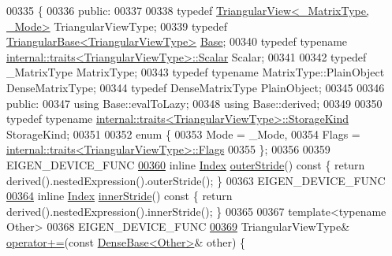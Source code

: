 \begin{DoxyCode}
00335 \{
00336   \textcolor{keyword}{public}:
00337 
00338     \textcolor{keyword}{typedef} \hyperlink{group___core___module_class_eigen_1_1_triangular_view}{TriangularView<\_MatrixType, \_Mode>} TriangularViewType;
00339     \textcolor{keyword}{typedef} \hyperlink{group___core___module_class_eigen_1_1_triangular_base}{TriangularBase<TriangularViewType>} 
      \hyperlink{class_eigen_1_1_triangular_view_impl}{Base};
00340     \textcolor{keyword}{typedef} \textcolor{keyword}{typename} \hyperlink{struct_eigen_1_1internal_1_1traits}{internal::traits<TriangularViewType>::Scalar}
       Scalar;
00341 
00342     \textcolor{keyword}{typedef} \_MatrixType MatrixType;
00343     \textcolor{keyword}{typedef} \textcolor{keyword}{typename} MatrixType::PlainObject DenseMatrixType;
00344     \textcolor{keyword}{typedef} DenseMatrixType PlainObject;
00345 
00346   \textcolor{keyword}{public}:
00347     \textcolor{keyword}{using} Base::evalToLazy;
00348     \textcolor{keyword}{using} Base::derived;
00349 
00350     \textcolor{keyword}{typedef} \textcolor{keyword}{typename} \hyperlink{struct_eigen_1_1internal_1_1traits}{internal::traits<TriangularViewType>::StorageKind}
       StorageKind;
00351 
00352     \textcolor{keyword}{enum} \{
00353       Mode = \_Mode,
00354       Flags = \hyperlink{struct_eigen_1_1internal_1_1traits}{internal::traits<TriangularViewType>::Flags}
00355     \};
00356 
00359     EIGEN\_DEVICE\_FUNC
\hyperlink{group___core___module_added5657459878085cb95d5052b1dd14}{00360}     \textcolor{keyword}{inline} \hyperlink{group___core___module_a554f30542cc2316add4b1ea0a492ff02}{Index} \hyperlink{group___core___module_added5657459878085cb95d5052b1dd14}{outerStride}()\textcolor{keyword}{ const }\{ \textcolor{keywordflow}{return} derived().nestedExpression().outerStride(); \}
00363     EIGEN\_DEVICE\_FUNC
\hyperlink{group___core___module_aff17b6873e916ed22b8aadc14c2b1df9}{00364}     \textcolor{keyword}{inline} \hyperlink{group___core___module_a554f30542cc2316add4b1ea0a492ff02}{Index} \hyperlink{group___core___module_aff17b6873e916ed22b8aadc14c2b1df9}{innerStride}()\textcolor{keyword}{ const }\{ \textcolor{keywordflow}{return} derived().nestedExpression().innerStride(); \}
00365 
00367     \textcolor{keyword}{template}<\textcolor{keyword}{typename} Other>
00368     EIGEN\_DEVICE\_FUNC
\hyperlink{group___core___module_ab6fa10c605bc81813d6a4ab243bb54b1}{00369}     TriangularViewType&  \hyperlink{group___core___module_ab6fa10c605bc81813d6a4ab243bb54b1}{operator+=}(\textcolor{keyword}{const} \hyperlink{group___core___module_class_eigen_1_1_dense_base}{DenseBase<Other>}& other) \{

\end{DoxyCode}
